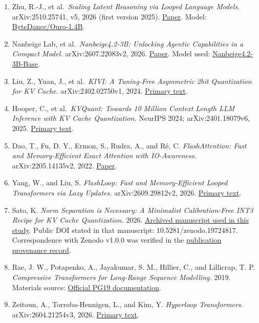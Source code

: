 \documentclass[10pt,a4paper]{article}
\newcommand{\tightlist}{\setlength{\itemsep}{1pt}\setlength{\parskip}{0pt}}
\begin{document}
\begin{enumerate}
\def\labelenumi{\arabic{enumi}.}
\tightlist
\item
  Zhu, R.-J., et al.~\emph{Scaling Latent Reasoning via Looped Language Models.} arXiv:2510.25741, v5, 2026 (first version 2025). \href{https://arxiv.org/abs/2510.25741v5}{Paper}. Model: \href{https://huggingface.co/ByteDance/Ouro-1.4B}{ByteDance/Ouro-1.4B}.
\item
  Nanbeige Lab, et al.~\emph{Nanbeige4.2-3B: Unlocking Agentic Capabilities in a Compact Model.} arXiv:2607.22083v2, 2026. \href{https://arxiv.org/abs/2607.22083v2}{Paper}. Model used: \href{https://huggingface.co/Nanbeige/Nanbeige4.2-3B-Base}{Nanbeige4.2-3B-Base}.
\item
  Liu, Z., Yuan, J., et al.~\emph{KIVI: A Tuning-Free Asymmetric 2bit Quantization for KV Cache.} arXiv:2402.02750v1, 2024. \href{https://arxiv.org/html/2402.02750v1}{Primary text}.
\item
  Hooper, C., et al.~\emph{KVQuant: Towards 10 Million Context Length LLM Inference with KV Cache Quantization.} NeurIPS 2024; arXiv:2401.18079v6, 2025. \href{https://arxiv.org/html/2401.18079v6}{Primary text}.
\item
  Dao, T., Fu, D. Y., Ermon, S., Rudra, A., and Ré, C. \emph{FlashAttention: Fast and Memory-Efficient Exact Attention with IO-Awareness.} arXiv:2205.14135v2, 2022. \href{https://arxiv.org/abs/2205.14135v2}{Paper}.
\item
  Yang, W., and Liu, S. \emph{FlashLoop: Fast and Memory-Efficient Looped Transformers via Lazy Updates.} arXiv:2609.29812v2, 2026. \href{https://arxiv.org/html/2609.29812v2}{Primary text}.
\item
  Sato, K. \emph{Norm Separation is Necessary: A Minimalist Calibration-Free INT3 Recipe for KV Cache Quantization.} 2026. \href{https://doi.org/10.5281/zenodo.19724817}{Archived manuscript used in this study}. Public DOI stated in that manuscript: 10.5281/zenodo.19724817. Correspondence with Zenodo v1.0.0 was verified in the \href{https://github.com/metaSATOKEN/nsn/blob/c37d39ea0106274d9f661cfbb268b0ed05319846/metadata/publication-provenance/README.md}{publication provenance record}.
\item
  Rae, J. W., Potapenko, A., Jayakumar, S. M., Hillier, C., and Lillicrap, T. P. \emph{Compressive Transformers for Long-Range Sequence Modelling.} 2019. Materials source: \href{https://github.com/google-deepmind/pg19}{Official PG19 documentation}.
\item
  Zeitoun, A., Torroba-Hennigen, L., and Kim, Y. \emph{Hyperloop Transformers.} arXiv:2604.21254v3, 2026. \href{https://arxiv.org/html/2604.21254v3}{Primary text}.

\end{enumerate}
\end{document}
